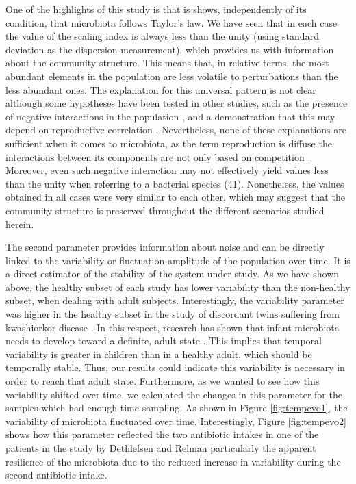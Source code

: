 One of the highlights of this study is that is shows, independently of its condition, that microbiota follows Taylor’s law. We have seen that in each case the value of the scaling index is always less than the unity (using standard deviation as the dispersion measurement), which provides us with information about the community structure. This means that, in relative terms, the most abundant elements in the population are less volatile to perturbations than the less abundant ones. The explanation for this universal pattern is not clear although some hypotheses have been tested in other studies, such as the presence of negative interactions in the population \cite{kilpatrick}, and a demonstration that this may depend on reproductive correlation \cite{ballantyne}. Nevertheless, none of these explanations are sufficient when it comes to microbiota, as the term reproduction is diffuse the interactions between its components are not only based on competition \cite{joao, mehta, bucci}. Moreover, even such negative interaction may not effectively yield values less than the unity when referring to a bacterial species (41). Nonetheless, the values obtained in all cases were very similar to each other, which may suggest that the community structure is preserved throughout the different scenarios studied herein.

The second parameter provides information about noise and can be directly linked to the variability or fluctuation amplitude of the population over time. It is a direct estimator of the stability of the system under study. As we have shown above, the healthy subset of each study has lower variability than the non-healthy subset, when dealing with adult subjects. Interestingly, the variability parameter was higher in the healthy subset in the study of discordant twins suffering from kwashiorkor disease \cite{kwashiorkor}. In this respect, research has shown that infant microbiota needs to develop toward a definite, adult state \cite{koenig}. This implies that temporal variability is greater in children than in a healthy adult, which should be temporally stable. Thus, our results could indicate this variability is necessary in order to reach that adult state. Furthermore, as we wanted to see how this variability shifted over time, we calculated the changes in this parameter for the samples which had enough time sampling. As shown in Figure \ref{fig:tempevo1}, the variability of microbiota fluctuated over time. Interestingly, Figure \ref{fig:tempevo2} shows how this parameter reflected the two antibiotic intakes in one of the patients in the study by Dethlefsen and Relman \cite{antibiotic} particularly the apparent resilience of the microbiota due to the reduced increase in variability during the second antibiotic intake.


